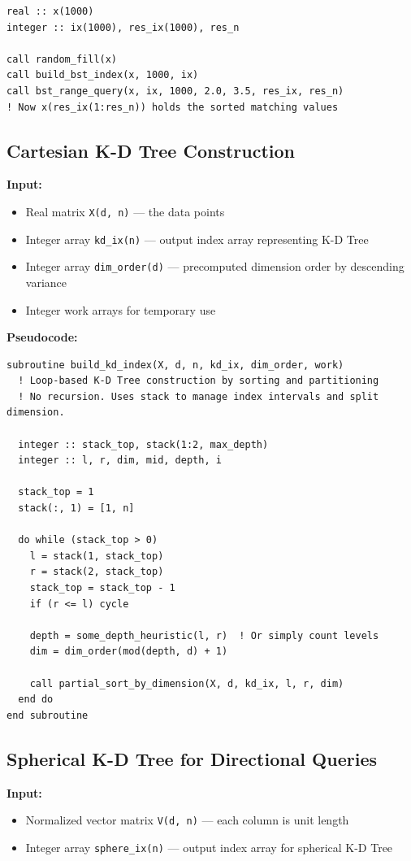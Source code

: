 \documentclass{article}
\begin{document}
\begin{verbatim}
real :: x(1000)
integer :: ix(1000), res_ix(1000), res_n

call random_fill(x)
call build_bst_index(x, 1000, ix)
call bst_range_query(x, ix, 1000, 2.0, 3.5, res_ix, res_n)
! Now x(res_ix(1:res_n)) holds the sorted matching values
\end{verbatim}

\subsection{Cartesian K-D Tree Construction}

\textbf{Input:}
\begin{itemize}
    \item Real matrix \texttt{X(d, n)} --- the data points
    \item Integer array \texttt{kd\_ix(n)} --- output index array representing K-D Tree
    \item Integer array \texttt{dim\_order(d)} --- precomputed dimension order by descending variance
    \item Integer work arrays for temporary use
\end{itemize}

\textbf{Pseudocode:}
\begin{verbatim}
subroutine build_kd_index(X, d, n, kd_ix, dim_order, work)
  ! Loop-based K-D Tree construction by sorting and partitioning
  ! No recursion. Uses stack to manage index intervals and split dimension.

  integer :: stack_top, stack(1:2, max_depth)
  integer :: l, r, dim, mid, depth, i

  stack_top = 1
  stack(:, 1) = [1, n]

  do while (stack_top > 0)
    l = stack(1, stack_top)
    r = stack(2, stack_top)
    stack_top = stack_top - 1
    if (r <= l) cycle

    depth = some_depth_heuristic(l, r)  ! Or simply count levels
    dim = dim_order(mod(depth, d) + 1)

    call partial_sort_by_dimension(X, d, kd_ix, l, r, dim)
  end do
end subroutine
\end{verbatim}

\subsection{Spherical K-D Tree for Directional Queries}

\textbf{Input:}
\begin{itemize}
    \item Normalized vector matrix \texttt{V(d, n)} --- each column is unit length
    \item Integer array \texttt{sphere\_ix(n)} --- output index array for spherical K-D Tree
\end{itemize}
\end{document}
